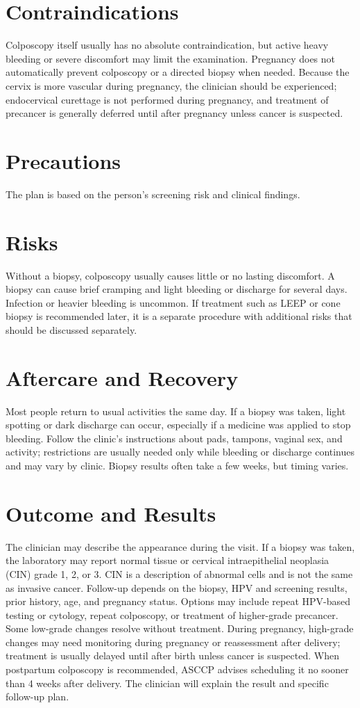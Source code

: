 \section*{Contraindications}
Colposcopy itself usually has no absolute contraindication, but active heavy bleeding or severe discomfort may limit the examination. Pregnancy does not automatically prevent colposcopy or a directed biopsy when needed. Because the cervix is more vascular during pregnancy, the clinician should be experienced; endocervical curettage is not performed during pregnancy, and treatment of precancer is generally deferred until after pregnancy unless cancer is suspected.

\section*{Precautions}
The plan is based on the person's screening risk and clinical findings.

\section*{Risks}
Without a biopsy, colposcopy usually causes little or no lasting discomfort. A biopsy can cause brief cramping and light bleeding or discharge for several days. Infection or heavier bleeding is uncommon. If treatment such as LEEP or cone biopsy is recommended later, it is a separate procedure with additional risks that should be discussed separately.

\section*{Aftercare and Recovery}
Most people return to usual activities the same day. If a biopsy was taken, light spotting or dark discharge can occur, especially if a medicine was applied to stop bleeding. Follow the clinic's instructions about pads, tampons, vaginal sex, and activity; restrictions are usually needed only while bleeding or discharge continues and may vary by clinic. Biopsy results often take a few weeks, but timing varies.

\section*{Outcome and Results}
The clinician may describe the appearance during the visit. If a biopsy was taken, the laboratory may report normal tissue or cervical intraepithelial neoplasia (CIN) grade 1, 2, or 3. CIN is a description of abnormal cells and is not the same as invasive cancer. Follow-up depends on the biopsy, HPV and screening results, prior history, age, and pregnancy status. Options may include repeat HPV-based testing or cytology, repeat colposcopy, or treatment of higher-grade precancer. Some low-grade changes resolve without treatment. During pregnancy, high-grade changes may need monitoring during pregnancy or reassessment after delivery; treatment is usually delayed until after birth unless cancer is suspected. When postpartum colposcopy is recommended, ASCCP advises scheduling it no sooner than 4 weeks after delivery. The clinician will explain the result and specific follow-up plan.

